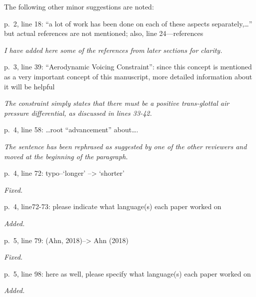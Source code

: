 \documentclass[]{article}
\begin{document}
The following other minor suggestions are noted:

p.~2, line 18: ``a lot of work has been done on each of these aspects
separately,\ldots{}'' but actual references are not mentioned; also,
line 24---references

\begin{adjustwidth}{1cm}{} \textit{
I have added here some of the references from later sections for clarity.
} \end{adjustwidth}

p.~3, line 39: ``Aerodynamic Voicing Constraint'': since this concept is
mentioned as a very important concept of this manuscript, more detailed
information about it will be helpful

\begin{adjustwidth}{1cm}{} \textit{
The constraint simply states that there must be a positive trans-glottal air pressure differential, as discussed in lines 33-42.
} \end{adjustwidth}

p.~4, line 58: \ldots{}root ``advancement'' about\ldots{}.

\begin{adjustwidth}{1cm}{} \textit{
The sentence has been rephrased as suggested by one of the other reviewers and moved at the beginning of the paragraph.
} \end{adjustwidth}

p.~4, line 72: typo--`longer' --\textgreater{} `shorter'

\begin{adjustwidth}{1cm}{} \textit{
Fixed.
} \end{adjustwidth}

p.~4, line72-73: please indicate what language(s) each paper worked on

\begin{adjustwidth}{1cm}{} \textit{
Added.
} \end{adjustwidth}

p.~5, line 79: (Ahn, 2018)--\textgreater{} Ahn (2018)

\begin{adjustwidth}{1cm}{} \textit{
Fixed.
} \end{adjustwidth}

p.~5, line 98: here as well, please specify what language(s) each paper
worked on

\begin{adjustwidth}{1cm}{} \textit{
Added.
} \end{adjustwidth}
\end{document}
